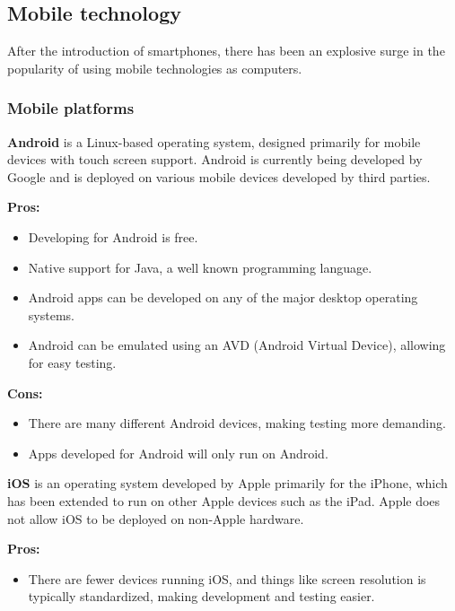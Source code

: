 \subsection{Mobile technology}

After the introduction of smartphones, there has been an explosive surge in the
popularity of using mobile technologies as computers.

\newpage
\subsubsection{Mobile platforms}
{\bf Android} is a Linux-based operating system, designed primarily for mobile
devices with touch screen support. Android is currently being developed by
Google and is deployed on various mobile devices developed by third parties.
\linebreak

\indent
  {\bf Pros:}
  \begin{itemize}
    \item Developing for Android is free.
    \item Native support for Java, a well known programming language.
    \item Android apps can be developed on any of the major desktop operating
          systems.
    \item Android can be emulated using an AVD (Android Virtual Device),
          allowing for easy testing.
  \end{itemize}

\indent
  {\bf Cons:}
  \begin{itemize}
    \item There are many different Android devices, making testing more
          demanding.
    \item Apps developed for Android will only run on Android.
  \end{itemize}

\noindent
{\bf iOS} is an operating system developed by Apple primarily for the iPhone,
which has been extended to run on other Apple devices such as the iPad. Apple
does not allow iOS to be deployed on non-Apple hardware.

\indent
  {\bf Pros:}
  \begin{itemize}
    \item There are fewer devices running iOS, and things like screen
          resolution is typically standardized, making development and testing
          easier.
  \end{itemize}

